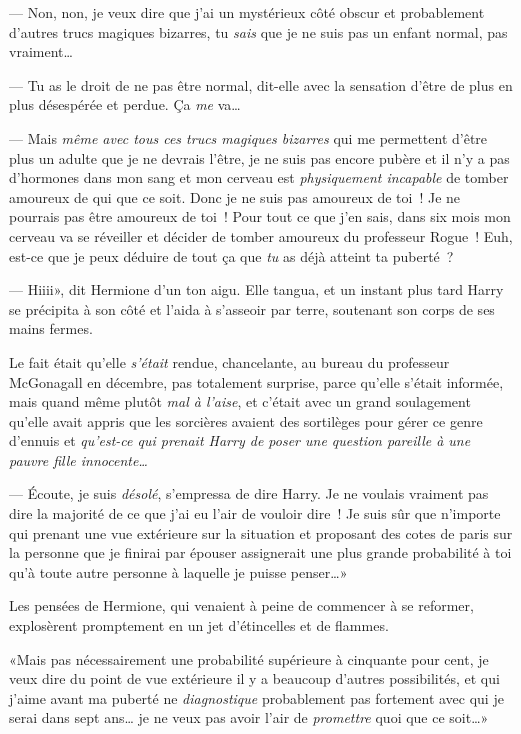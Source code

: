 --- Non, non, je veux dire que j'ai un mystérieux côté obscur et probablement d'autres trucs magiques bizarres, tu \emph{sais} que je ne suis pas un enfant normal, pas vraiment…

--- Tu as le droit de ne pas être normal, dit-elle avec la sensation d'être de plus en plus désespérée et perdue. Ça \emph{me} va…

--- Mais \emph{même avec tous ces trucs magiques bizarres} qui me permettent d'être plus un adulte que je ne devrais l'être, je ne suis pas encore pubère et il n'y a pas d'hormones dans mon sang et mon cerveau est \emph{physiquement incapable} de tomber amoureux de qui que ce soit. Donc je ne suis pas amoureux de toi~! Je ne pourrais pas être amoureux de toi~! Pour tout ce que j'en sais, dans six mois mon cerveau va se réveiller et décider de tomber amoureux du professeur Rogue~! Euh, est-ce que je peux déduire de tout ça que \emph{tu} as déjà atteint ta puberté~?

--- Hiiii», dit Hermione d'un ton aigu. Elle tangua, et un instant plus tard Harry se précipita à son côté et l'aida à s'asseoir par terre, soutenant son corps de ses mains fermes.

Le fait était qu'elle \emph{s'était} rendue, chancelante, au bureau du professeur McGonagall en décembre, pas totalement surprise, parce qu'elle s'était informée, mais quand même plutôt \emph{mal à l'aise}, et c'était avec un grand soulagement qu'elle avait appris que les sorcières avaient des sortilèges pour gérer ce genre d'ennuis et \emph{qu'est-ce qui prenait Harry de poser une question pareille à une pauvre fille innocente…}

--- Écoute, je suis \emph{désolé}, s'empressa de dire Harry. Je ne voulais vraiment pas dire la majorité de ce que j'ai eu l'air de vouloir dire~! Je suis sûr que n'importe qui prenant une vue extérieure sur la situation et proposant des cotes de paris sur la personne que je finirai par épouser assignerait une plus grande probabilité à toi qu'à toute autre personne à laquelle je puisse penser…»

Les pensées de Hermione, qui venaient à peine de commencer à se reformer, explosèrent promptement en un jet d'étincelles et de flammes.

«Mais pas nécessairement une probabilité supérieure à cinquante pour cent, je veux dire du point de vue extérieure il y a beaucoup d'autres possibilités, et qui j'aime avant ma puberté ne \emph{diagnostique} probablement pas fortement avec qui je serai dans sept ans… je ne veux pas avoir l'air de \emph{promettre} quoi que ce soit…»


